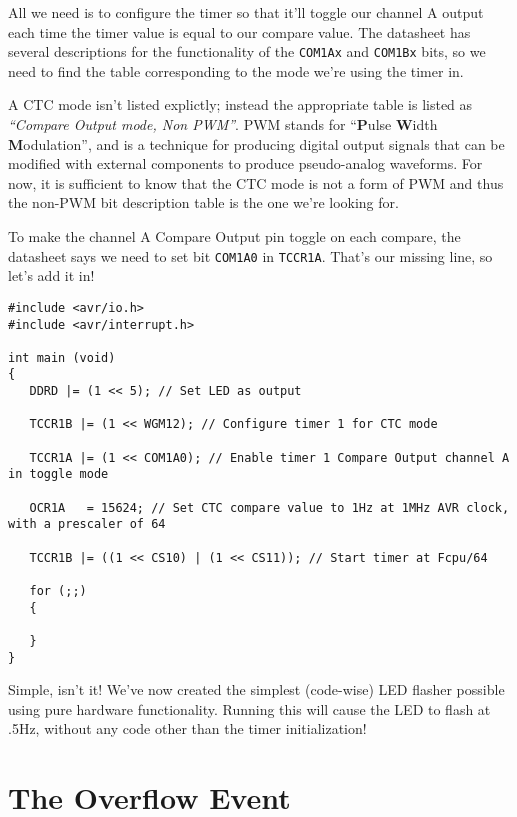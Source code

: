 \documentclass[a4paper,oneside,notitlepage]{book}
\begin{document}
All we need is to configure the timer so that it'll toggle our channel A output each time the timer value is equal to our compare value. The datasheet has several descriptions for the functionality of the \texttt{COM1Ax} and \texttt{COM1Bx} bits, so we need to find the table corresponding to the mode we're using the timer in.

A CTC mode isn't listed explictly; instead the appropriate table is listed as \textit{``Compare Output mode, Non PWM''}. PWM stands for ``\textbf{P}ulse \textbf{W}idth \textbf{M}odulation'', and is a technique for producing digital output signals that can be modified with external components to produce pseudo-analog waveforms. For now, it is sufficient to know that the CTC mode is not a form of PWM and thus the non-PWM bit description table is the one we're looking for.

To make the channel A Compare Output pin toggle on each compare, the datasheet says we need to set bit \texttt{COM1A0} in \texttt{TCCR1A}. That's our missing line, so let's add it in!

\begin{center}
\begin{lstlisting}
#include <avr/io.h>
#include <avr/interrupt.h>

int main (void)
{
   DDRD |= (1 << 5); // Set LED as output

   TCCR1B |= (1 << WGM12); // Configure timer 1 for CTC mode

   TCCR1A |= (1 << COM1A0); // Enable timer 1 Compare Output channel A in toggle mode

   OCR1A   = 15624; // Set CTC compare value to 1Hz at 1MHz AVR clock, with a prescaler of 64

   TCCR1B |= ((1 << CS10) | (1 << CS11)); // Start timer at Fcpu/64

   for (;;)
   {

   }
}
\end{lstlisting}
\end{center}

Simple, isn't it! We've now created the simplest (code-wise) LED flasher possible using pure hardware functionality. Running this will cause the LED to flash at .5Hz, without any code other than the timer initialization!


\label{chp:Overflows}
\chapter{The Overflow Event}
\end{document}
